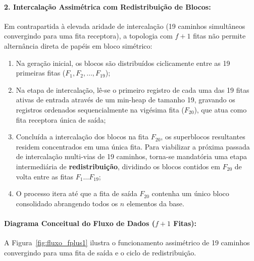 \documentclass[12pt,a4paper]{article}
\begin{document}
\paragraph{2. Intercalação Assimétrica com Redistribuição de Blocos:}
Em contrapartida à elevada aridade de intercalação (19 caminhos simultâneos convergindo para uma fita receptora), a topologia com $f+1$ fitas não permite alternância direta de papéis em bloco simétrico:
\begin{enumerate}
    \item Na geração inicial, os blocos são distribuídos ciclicamente entre as 19 primeiras fitas ($F_1, F_2, \dots, F_{19}$);
    \item Na etapa de intercalação, lê-se o primeiro registro de cada uma das 19 fitas ativas de entrada através de um min-heap de tamanho 19, gravando os registros ordenados sequencialmente na vigésima fita ($F_{20}$), que atua como fita receptora única de saída;
    \item Concluída a intercalação dos blocos na fita $F_{20}$, os superblocos resultantes residem concentrados em uma única fita. Para viabilizar a próxima passada de intercalação multi-vias de 19 caminhos, torna-se mandatória uma etapa intermediária de \textbf{redistribuição}, dividindo os blocos contidos em $F_{20}$ de volta entre as fitas $F_1 \dots F_{19}$;
    \item O processo itera até que a fita de saída $F_{20}$ contenha um único bloco consolidado abrangendo todos os $n$ elementos da base.
\end{enumerate}

\paragraph{Diagrama Conceitual do Fluxo de Dados ($f+1$ Fitas):}
A Figura~\ref{fig:fluxo_fplus1} ilustra o funcionamento assimétrico de 19 caminhos convergindo para uma fita de saída e o ciclo de redistribuição.
\end{document}
